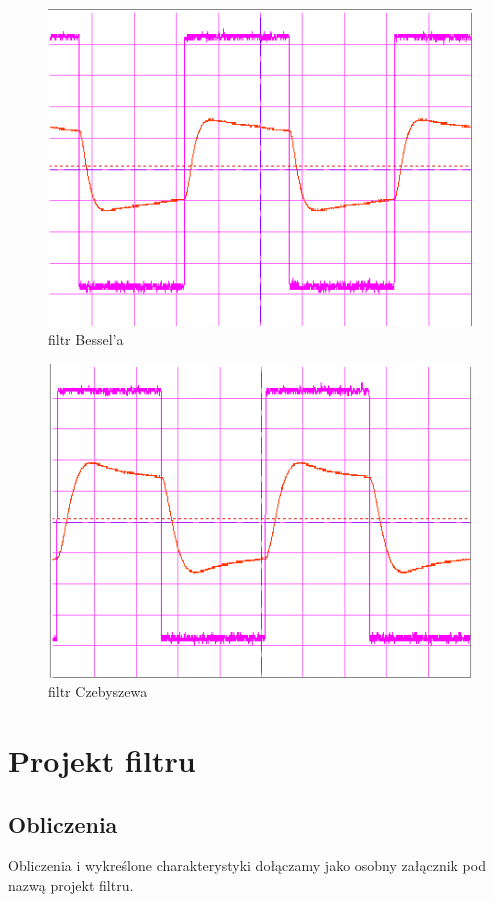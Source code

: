 \documentclass[a4paper,11pt]{article}
\begin{document}
\begin{figure}[H]
\begin{center}
\includegraphics{obrazki/bezelprostybialy.png}
\end{center}
\caption{filtr Bessel'a}
\end{figure}

\begin{figure}[H]
\begin{center}
\includegraphics{obrazki/tszebieszowprostzbialy.png}
\end{center}
\caption{filtr Czebyszewa}
\end{figure}

\section{Projekt filtru}
\subsection{Obliczenia}
Obliczenia i wykreślone charakterystyki dołączamy jako osobny załącznik pod nazwą projekt filtru.
\end{document}
